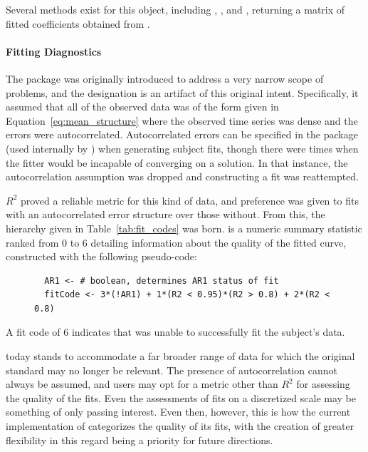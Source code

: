 Several methods exist for this object, including , , and , returning a matrix of fitted coefficients obtained from . 


\paragraph{Fitting Diagnostics}\label{sec:fitcode}

The  package was originally introduced to address a very narrow scope of problems, and the  designation is an artifact of this original intent. Specifically, it assumed that all of the observed data was of the form given in Equation~\ref{eq:mean_structure} where the observed time series was dense and the errors were autocorrelated. Autocorrelated errors can be specified in the  package (used internally by ) when generating subject fits, though there were times when the fitter would be incapable of converging on a solution. In that instance, the autocorrelation assumption was dropped and constructing a fit was reattempted.

$R^2$ proved a reliable metric for this kind of data, and preference was given to fits with an autocorrelated error structure over those without. From this, the hierarchy given in Table~\ref{tab:fit_codes} was born.  is a numeric summary statistic ranked from 0 to 6 detailing information about the quality of the fitted curve, constructed with the following pseudo-code:

\begin{singlespace}
\begin{figure}[H]
\centering
\begin{BVerbatim}
  AR1 <- # boolean, determines AR1 status of fit
  fitCode <- 3*(!AR1) + 1*(R2 < 0.95)*(R2 > 0.8) + 2*(R2 < 0.8)
\end{BVerbatim}
\end{figure}
\end{singlespace}

A fit code of 6 indicates that  was unable to successfully fit the 
subject's data. 

 today stands to accommodate a far broader range of data for which the original  standard may no longer be relevant. The presence of autocorrelation cannot always be assumed, and users may opt for a metric other than $R^2$ for assessing the quality of the fits. Even the assessments of fits on a discretized scale may be something of only passing interest. Even then, however, this is how the current implementation of  categorizes the quality of its fits, with the creation of greater flexibility in this regard being a priority for future directions. 

